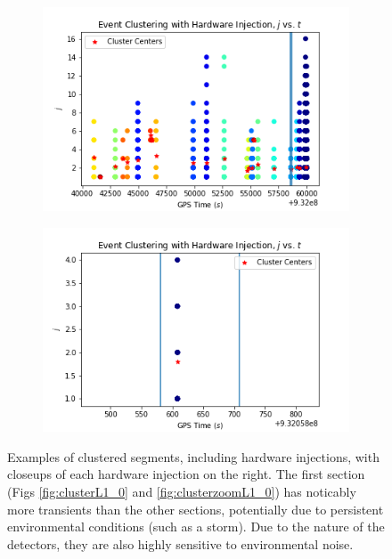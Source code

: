 \documentclass{article}
\begin{document}
\begin{figure}
\begin{subfigure}[t]{0.5\textwidth}
\includegraphics[width=\textwidth]{clusterL1_2.png}
\caption{\label{fig:clusterL1_2}}
\end{subfigure}
\begin{subfigure}[t]{0.5\textwidth}
\includegraphics[width=\textwidth]{clusterzoomL1_2.png}
\caption{\label{fig:clusterzoomL1_2}}
\end{subfigure}

\caption{Examples of clustered segments, including hardware injections, with closeups of each hardware injection on the right. The first section (Figs \ref{fig:clusterL1_0}	and \ref{fig:clusterzoomL1_0}) has noticably more transients than the other sections, potentially due to persistent environmental conditions (such as a storm). Due to the nature of the detectors, they are also highly sensitive to environmental noise\citep{McIver2012}.}
\label{fig:cluster}
\end{figure}
\end{document}
